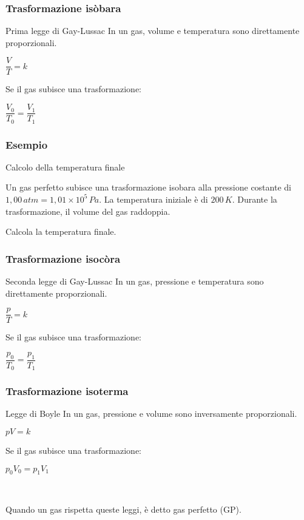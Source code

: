 \documentclass[]{beamer}
\theoremstyle{plain}
\begin{document}
\begin{frame}
\frametitle{Trasformazione isòbara}
\begin{block}{Prima legge di Gay-Lussac}
In un gas, volume e temperatura sono direttamente proporzionali.
\begin{center}
$ \dfrac{V}{T} = k $
\end{center}\pause
Se il gas subisce una trasformazione:
\begin{center}
\colorbox{blue!30}{$ \dfrac{V_0}{T_0} = \dfrac{V_1}{T_1} $}
\end{center}
\end{block}
\end{frame}



\begin{frame}
\frametitle{Esempio}
\begin{exampleblock}{Calcolo della temperatura finale}
{\small Un gas perfetto subisce una trasformazione isobara alla pressione costante di $ 1,00 \, atm = 1,01 \times 10^5 \, Pa  $. La temperatura iniziale è di $ 200 \, K $. Durante la trasformazione, il volume del gas raddoppia.

Calcola la temperatura finale.}
\end{exampleblock}
\end{frame}




\begin{frame}
\frametitle{Trasformazione isocòra}
\begin{block}{Seconda legge di Gay-Lussac}
In un gas, pressione e temperatura sono direttamente proporzionali.
\begin{center}
$ \dfrac{p}{T} = k $
\end{center}\pause
Se il gas subisce una trasformazione:
\begin{center}
\colorbox{blue!30}{$ \dfrac{p_0}{T_0} = \dfrac{p_1}{T_1} $}
\end{center}
\end{block}
\end{frame}



\begin{frame}
\frametitle{Trasformazione isoterma}
\begin{block}{Legge di Boyle}
In un gas, pressione e volume sono inversamente proporzionali.
\begin{center}
$ pV = k $
\end{center}\pause
Se il gas subisce una trasformazione:
\begin{center}
\colorbox{blue!30}{$ p_0 V_0 = p_1 V_1 $}
\end{center}
\end{block}\pause

~

Quando un gas rispetta queste leggi, è detto \alert{gas perfetto} (GP).
\end{frame}
\end{document}
